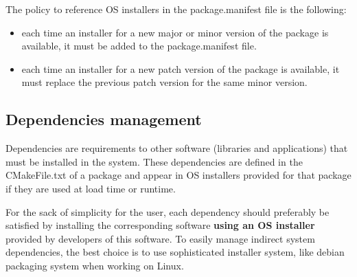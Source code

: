 \documentclass[12pt,a4paper]{article}
\begin{document}
The policy to reference OS installers in the package.manifest file is the following:
\begin{itemize}
\item each time an installer for a new major or minor version of the package is available, it must be added to the package.manifest file.
\item each time an installer for a new patch version of the package is available, it must replace the previous patch version for the same minor version.
\end{itemize}

\subsection{Dependencies management}

Dependencies are requirements to other software (libraries and applications) that must be installed in the system. These dependencies are defined in the CMakeFile.txt of a package and appear in OS installers provided for that package if they are used at load time or runtime. 

For the sack of simplicity for the user, each dependency should preferably be satisfied by installing the corresponding software \textbf{using an OS installer} provided by developers of this software. To easily manage indirect system dependencies, the best choice is to use sophisticated installer system, like debian packaging system when working on Linux.
\end{document}

